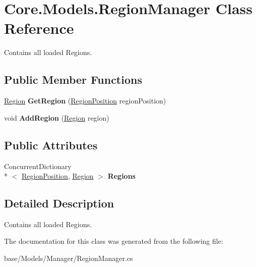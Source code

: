 \hypertarget{classCore_1_1Models_1_1RegionManager}{\section{Core.\-Models.\-Region\-Manager Class Reference}
\label{classCore_1_1Models_1_1RegionManager}
}


Contains all loaded Regions.  


\subsection*{Public Member Functions}
\begin{DoxyCompactItemize}
\item 
\hypertarget{classCore_1_1Models_1_1RegionManager_a67a6954541a89c4135f414de61408ef8}{\hyperlink{classCore_1_1Models_1_1Region}{Region} {\bfseries Get\-Region} (\hyperlink{classCore_1_1Models_1_1RegionPosition}{Region\-Position} region\-Position)}\label{classCore_1_1Models_1_1RegionManager_a67a6954541a89c4135f414de61408ef8}

\item 
\hypertarget{classCore_1_1Models_1_1RegionManager_a2b44e4b56f8c00120f87f0b5bd0b1bcf}{void {\bfseries Add\-Region} (\hyperlink{classCore_1_1Models_1_1Region}{Region} region)}\label{classCore_1_1Models_1_1RegionManager_a2b44e4b56f8c00120f87f0b5bd0b1bcf}

\end{DoxyCompactItemize}
\subsection*{Public Attributes}
\begin{DoxyCompactItemize}
\item 
\hypertarget{classCore_1_1Models_1_1RegionManager_a0c119456a8a49f28a14213dad448a5da}{Concurrent\-Dictionary\\*
$<$ \hyperlink{classCore_1_1Models_1_1RegionPosition}{Region\-Position}, \hyperlink{classCore_1_1Models_1_1Region}{Region} $>$ {\bfseries Regions}}\label{classCore_1_1Models_1_1RegionManager_a0c119456a8a49f28a14213dad448a5da}

\end{DoxyCompactItemize}


\subsection{Detailed Description}
Contains all loaded Regions. 



The documentation for this class was generated from the following file\-:\begin{DoxyCompactItemize}
\item 
base/\-Models/\-Manager/Region\-Manager.\-cs\end{DoxyCompactItemize}

